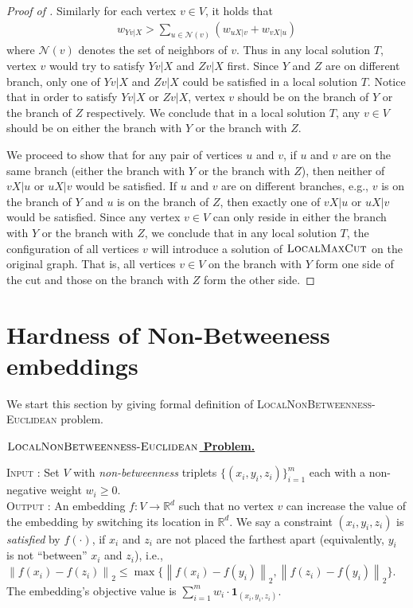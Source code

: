 \documentclass{article}
\theoremstyle{definition}  %
\theoremstyle{plain}
\numberwithin{observation}{section}
\numberwithin{claim}{section}
\numberwithin{fact}{section}
\numberwithin{lemma}{section}
\numberwithin{proposition}{section}
\numberwithin{theorem}{section}
\numberwithin{corollary}{section}
\numberwithin{definition}{section}
\newcommand{\norm}[1]{\left\| #1 \right\|}
\newcommand{\x}{x}
\newcommand{\y}{y}
\newcommand{\z}{z}
\newcommand{\anc}{\x}
\newcommand{\pos}{\y}
\renewcommand{\neg}{\z}
\newenvironment{nproblem}[1][\unskip]{%
  \medskip
  \begin{mdframed}
  \noindent
  \textbf{\underline{$#1$ Problem.}} \\
  \noindent
}{%
  \end{mdframed}
  \medskip %
}
\newcommand{\nbtw}{\textsc{LocalNonBetweenness-Euclidean}}
\theoremstyle{plain}
\begin{document}
\begin{proof}[Proof of ]
Similarly for each vertex $v \in V$, it holds that 
\begin{align*}
    w_{Yv|X} > \sum_{u \in \mathcal{N}(v)} \left(w_{uX|v} + w_{vX|u}\right)
\end{align*}
where $\mathcal{N}(v)$ denotes the set of neighbors of $v$. Thus in any local solution $T$, vertex $v$ would try to satisfy $Yv|X$ and $Zv|X$ first. Since $Y$ and $Z$ are on different branch, only one of $Yv|X$ and $Zv|X$ could be satisfied in a local solution $T$. Notice that in order to satisfy $Yv|X$ or $Zv|X$, vertex $v$ should be on the branch of $Y$ or the branch of $Z$ respectively. We conclude that in a local solution $T$, any $v \in V$ should be on either the branch with $Y$ or the branch with $Z$.

We proceed to show that for any pair of vertices $u$ and $v$, if $u$ and $v$ are on the same branch (either the branch with $Y$ or the branch with $Z$), then neither of $vX|u$ or $uX|v$ would be satisfied. If $u$ and $v$ are on different branches, e.g., $v$ is on the branch of $Y$ and $u$ is on the branch of $Z$, then exactly one of $vX|u$ or $uX|v$ would be satisfied. Since any vertex $v \in V$ can only reside in either the branch with $Y$ or the branch with $Z$, we conclude that in any local solution $T$, the configuration of all vertices $v$ will introduce a solution of $\textsc{LocalMaxCut}$ on the original graph. That is, all vertices $v \in V$ on the branch with $Y$ form one side of the cut and those on the branch with $Z$ form the other side.
\end{proof}
\section{Hardness of Non-Betweeness embeddings}\label{app:extensions}

We start this section by giving formal definition of \textsc{LocalNonBetweenness-Euclidean} problem.

\begin{nproblem}[\nbtw]
   \textsc{Input :} Set $V$  with \textit{non-betweenness} triplets $\{(\anc_i, \pos_i, \neg_{i})\}_{i = 1}^m$ each with a non-negative weight $w_i \ge 0$.
\\
  \noindent \textsc{Output :}  An embedding $f: V \to \mathbb{R}^d$ such that no vertex $v$ can increase the value of the embedding by switching its location in $\mathbb{R}^d$. We say a constraint $(x_i, y_i, z_i)$ is \emph{satisfied} by $f(\cdot)$, if $x_i$ and $z_i$ are not placed the farthest apart (equivalently, $y_i$ is not ``between'' $x_i$ and $z_i$), i.e., $\norm{f(x_i) - f(z_i)}_2 \leq \max\{\norm{f(x_i) - f(y_i)}_2, \norm{f(z_i) - f(y_i)}_2\}$. The embedding's objective value is $\sum_{i=1}^m w_i \cdot \mathbf{1}_{(x_i, y_i, z_i)}$.
\end{nproblem}
\end{document}
